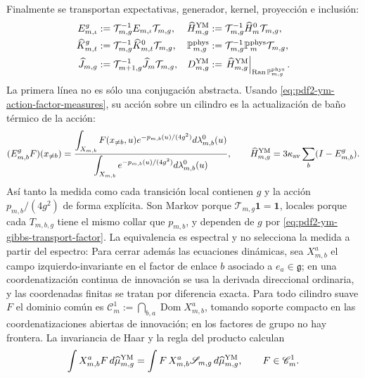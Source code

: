 Finalmente se transportan expectativas, generador, kernel, proyección e inclusión:
\begin{equation}\label{eq:pdf2-ym-g-dynamics}
 \begin{aligned}
 E_{m,\iota}^{g}&:=\mathcal T_{m,g}^{-1}E_{m,\iota}\mathcal T_{m,g},&
 \widehat H_{m,g}^{\rm YM}&:=\mathcal T_{m,g}^{-1}\widehat H_m^0\mathcal T_{m,g},\\
 \widehat K_{m,t}^{g}&:=\mathcal T_{m,g}^{-1}\widehat K_{m,t}^{0}\mathcal T_{m,g},&
 \mathbb P_{m,g}^{\rm phys}&:=\mathcal T_{m,g}^{-1}
     \mathbb P_m^{\rm phys}\mathcal T_{m,g},\\
 \widehat J_{m,g}&:=\mathcal T_{m+1,g}^{-1}
     \widehat J_m\mathcal T_{m,g},&
 D_{m,g}^{\rm YM}&:=\left.\widehat H_{m,g}^{\rm YM}
     \right|_{\operatorname{Ran}\mathbb P_{m,g}^{\rm phys}}.
 \end{aligned}
\end{equation}
La primera línea no es sólo una conjugación abstracta. Usando
\eqref{eq:pdf2-ym-action-factor-measures}, su acción sobre un cilindro es la
actualización de baño térmico de la acción:
\begin{equation}\label{eq:pdf2-ym-gibbs-conditional-expectation}
 (E_{m,b}^{g}F)(x_{\ne b})
 =\frac{\displaystyle
   \int_{X_{m,b}}F(x_{\ne b},u)e^{-p_{m,b}(u)/(4g^2)}
       d\lambda_{m,b}^0(u)}{\displaystyle
   \int_{X_{m,b}}e^{-p_{m,b}(u)/(4g^2)}d\lambda_{m,b}^0(u)},
 \qquad
 \widehat H_{m,g}^{\rm YM}
 =3\kappa_{\rm av}\sum_b(I-E_{m,b}^{g}).
\end{equation}
Así tanto la medida como cada transición local contienen $g$ y la acción
$p_{m,b}/(4g^2)$ de forma explícita.
Son Markov porque $\mathcal T_{m,g}\mathbf1=\mathbf1$, locales porque cada
$T_{m,b,g}$ tiene el mismo collar que $p_{m,b}$, y dependen de $g$ por
\eqref{eq:pdf2-ym-gibbs-transport-factor}. La equivalencia es espectral y no
selecciona la medida a partir del espectro:
Para cerrar además las ecuaciones dinámicas, sea $X_{m,b}^a$ el campo
izquierdo-invariante en el factor de enlace $b$ asociado a
$e_a\in\mathfrak g$; en una coordenatización continua de innovación se usa la derivada
direccional ordinaria, y las coordenadas finitas se tratan por diferencia exacta.
Para todo cilindro suave $F$ el dominio común es
$\mathscr C_m^1:=\bigcap_{b,a}\operatorname{Dom}X_{m,b}^a$, tomando soporte
compacto en las coordenatizaciones abiertas de innovación; en los factores de grupo no hay
frontera. La invariancia de Haar y la regla del producto calculan
\begin{equation}\label{eq:pdf2-ym-schwinger-dyson-finite}
 \int X_{m,b}^aF\,d\widehat\mu_{m,g}^{\rm YM}
 =\int F\,X_{m,b}^a\mathscr S_{m,g}\,d\widehat\mu_{m,g}^{\rm YM},
 \qquad F\in\mathscr C_m^1.
\end{equation}
